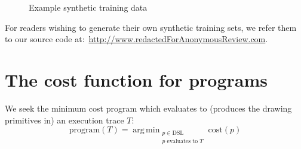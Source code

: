 \documentclass{article}
\DeclareMathOperator*{\argmin}{arg\,min} %
\DeclareMathOperator{\argmin}{argmin} %
\begin{document}
\begin{figure}
      \begin{minipage}[t]{2.2cm}\end{minipage}
      \begin{minipage}[t]{2.2cm}\end{minipage}
      \begin{minipage}[t]{2.2cm}\end{minipage}
      \begin{minipage}[t]{2.2cm}\end{minipage}
      \caption{Example synthetic training data}\label{exampleTrainingData}
\end{figure}

For readers wishing to generate their own synthetic training sets,
we refer them to our source code at:~\url{http://www.redactedForAnonymousReview.com}.

\section{The cost function for programs}

We seek the minimum cost program which evaluates to (produces the drawing primitives in) an execution trace $T$:
\begin{equation}
  \text{program}(T) = \argmin_{\substack{p\in \text{DSL}\\p \text{ evaluates to } T}} \text{cost}(p)\label{programObjective}
\end{equation}
\end{document}
